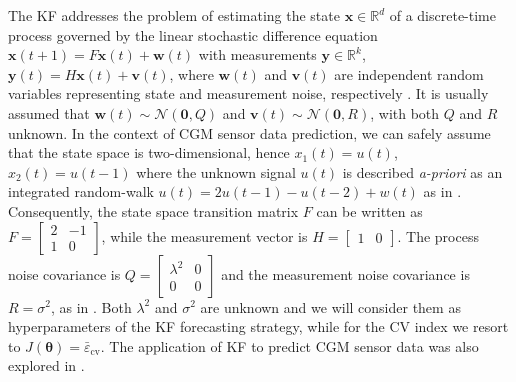 The KF addresses the problem of estimating the state $\bm{x} \in \mathbb{R}^d$ of a discrete-time process governed by the linear stochastic difference equation
$\bm{x}(t+1) = F\bm{x}(t) + \bm{w}(t)$
with measurements $\bm{y} \in \mathbb{R}^k$,
$\bm{y}(t) = H\bm{x}(t)+\bm{v}(t)$,
where $\bm{w}(t)$ and $\bm{v}(t)$ are independent random variables representing state and measurement noise, respectively \cite{welch1995introduction}. It is usually assumed that $\bm{w}(t)\sim \mathcal{N}(\bm{0}, Q)$ and $\bm{v}(t)\sim \mathcal{N}(\bm{0}, R)$, with both $Q$ and $R$ unknown. In the context of CGM sensor data prediction, we can safely assume that the state space is two-dimensional, hence $x_1(t)=u(t)$, $x_2(t)=u(t-1)$ where the unknown signal $u(t)$ is described {\em a-priori} as an integrated random-walk $u(t)=2u(t-1)-u(t-2)+w(t)$ as in \cite{facchinetti2010online}. Consequently, the state space transition matrix $F$ can be written as $F=[\begin{smallmatrix}  2 & -1  \\  1 & 0\end{smallmatrix}]$,
while the measurement vector is $H = [\begin{smallmatrix} 1 & 0 \end{smallmatrix}]$. The process noise covariance is
$Q=
[\begin{smallmatrix}
\lambda^2 & 0  \\
0 & 0
\end{smallmatrix}
]$
and the measurement noise covariance is $R = \sigma^2$, as in \cite{facchinetti2010online}. Both $\lambda^2$ and $\sigma^2$ are unknown and we will consider them as hyperparameters of the KF forecasting strategy, while for the CV index we resort to $J(\bm{\theta})= \bar{\varepsilon}_{\text{cv}}$.
The application of KF to predict CGM sensor data was also explored in \cite{facchinetti2010online, knobbe2005extended}.


